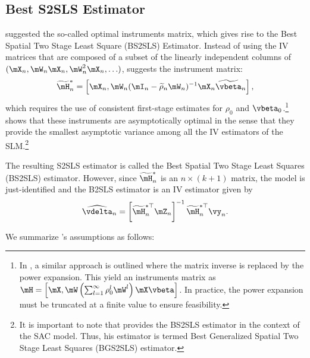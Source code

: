 \subsection{Best S2SLS Estimator}\label{sec:BS2SLS}

\cite{lee2003best} suggested the so-called optimal instruments matrix, which gives rise to the Best Spatial Two Stage Least Square (BS2SLS) Estimator. Instead of using the IV matrices that are composed of a subset of the linearly independent columns of $(\mX_n, \mW_n\mX_n, \mW^2_n\mX_n, \ldots)$, \cite{lee2003best} suggests the instrument matrix:
\begin{equation*}
\widetilde{\mH}^{*}_n =\left[\mX_n, \mW_n(\mI_n - \widetilde{\rho}_n\mW_n)^{-1}\mX_n\widetilde{\vbeta}_n\right],
\end{equation*}
%
which requires the use of consistent first-stage estimates for $\rho_0$ and $\vbeta_0$.\footnote{In \cite{Keliejian2004}, a similar approach is outlined where the matrix inverse is replaced by the power expansion. This yield an instruments matrix as $\mH =\left[\mX, \mW\left(\sum_{l = 1}^{\infty}\rho_0^{l}\mW^l\right)\mX\vbeta\right]$. In practice, the power expansion must be truncated at a finite value to ensure feasibility.} \cite{lee2003best} shows that these instruments are asymptotically optimal in the sense that they provide the smallest asymptotic variance among all the IV estimators of the SLM.\footnote{It is important to note that \cite{lee2003best} provides the BS2SLS estimator in the context of the SAC model. Thus, his estimator is termed Best Generalized Spatial Two Stage Least Squares (BGS2SLS) estimator. }

The resulting S2SLS estimator is called the Best Spatial Two Stage Least Squares (BS2SLS) estimator. However, since $\widetilde{\mH}^{*}_n$ is an $n \times (k + 1)$ matrix, the model is just-identified and the B2SLS estimator is an IV estimator given by
\begin{equation}\label{eq:bs2sls-estimator}
\widehat{\vdelta}_n = \left[\widetilde{\mH}^{*\top}_n\mZ_n\right]^{-1}\widetilde{\mH}^{*\top}_n\vy_n.
\end{equation}

We summarize \cite{lee2003best}'s assumptions as follows:

